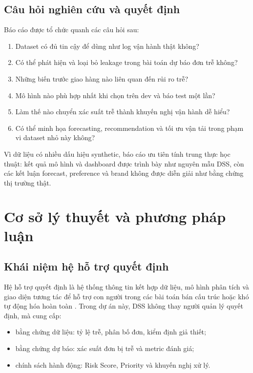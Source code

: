 \documentclass[12pt,a4paper,oneside]{report}
\begin{document}
\section{Câu hỏi nghiên cứu và quyết định}

Báo cáo được tổ chức quanh các câu hỏi sau:

\begin{enumerate}[leftmargin=*]
  \item Dataset có đủ tin cậy để dùng như log vận hành thật không?
  \item Có thể phát hiện và loại bỏ leakage trong bài toán dự báo đơn trễ không?
  \item Những biến trước giao hàng nào liên quan đến rủi ro trễ?
  \item Mô hình nào phù hợp nhất khi chọn trên dev và báo test một lần?
  \item Làm thế nào chuyển xác suất trễ thành khuyến nghị vận hành dễ hiểu?
  \item Có thể minh họa forecasting, recommendation và tối ưu vận tải trong
        phạm vi dataset nhỏ này không?
\end{enumerate}

\begin{insight}
Vì dữ liệu có nhiều dấu hiệu synthetic, báo cáo ưu tiên tính trung thực học
thuật: kết quả mô hình và dashboard được trình bày như nguyên mẫu DSS, còn các
kết luận forecast, preference và brand không được diễn giải như bằng chứng thị
trường thật.
\end{insight}

\chapter{Cơ sở lý thuyết và phương pháp luận}

\section{Khái niệm hệ hỗ trợ quyết định}

Hệ hỗ trợ quyết định là hệ thống thông tin kết hợp dữ liệu, mô hình phân tích
và giao diện tương tác để hỗ trợ con người trong các bài toán bán cấu trúc hoặc
khó tự động hóa hoàn toàn \cite{power2002}. Trong dự án này, DSS không thay
người quản lý quyết định, mà cung cấp:

\begin{itemize}[leftmargin=*]
  \item bằng chứng dữ liệu: tỷ lệ trễ, phân bố đơn, kiểm định giả thiết;
  \item bằng chứng dự báo: xác suất đơn bị trễ và metric đánh giá;
  \item chính sách hành động: Risk Score, Priority và khuyến nghị xử lý.
\end{itemize}
\end{document}
